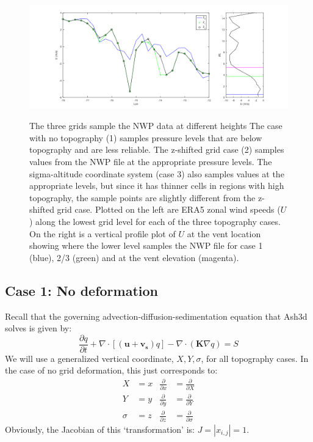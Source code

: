 \begin{figure}[htbp]\vspace*{0cm}\hspace*{0cm}
\includegraphics[angle=0,scale=0.4]{Figures/Apx_Topo/Topo_U.png}\\
\parbox{15cm}{\caption{\label{FigTopo_SurfU}
The three grids sample the NWP data at different heights
The case with no topography (1) samples pressure levels that are below topography
and are less reliable. The z-shifted grid case (2) samples values from the NWP file
at the appropriate pressure levels. The sigma-altitude coordinate system (case 3) also
samples values at the appropriate levels, but since it has thinner cells in regions with
high topography, the sample points are slightly different from the z-shifted
grid case. Plotted on the left are ERA5 zonal wind speeds ($U$) along the lowest grid
level for each of the three topography cases. On the right is a vertical profile plot of $U$
at the vent location showing where the lower level samples the NWP file for case 1 (blue),
2/3 (green) and at the vent elevation (magenta).
}}
\end{figure}

\subsection{Case 1: No deformation}
Recall that the governing advection-diffusion-sedimentation equation that Ash3d solves is
given by:
\begin{equation}\label{EqGovEqVectApx}
 \frac{\partial q}{\partial t} +
   \nabla \cdot \left[ \left(\mathbf{u} + \mathbf{v_s} \right) q \right]
 - \nabla \cdot \left( \mathbf{K} \nabla q\right) = S
\end{equation}
We will use a generalized vertical coordinate, $X,Y,\sigma$, for all topography cases.
In the case of no grid deformation, this just corresponds to:
\begin{align*}
X &= x &  \frac{\partial}{\partial x} &= \frac{\partial}{\partial X}\\
Y &= y &  \frac{\partial}{\partial y} &= \frac{\partial}{\partial Y}\\
\sigma &= z &  \frac{\partial}{\partial z} &= \frac{\partial}{\partial \sigma}
\end{align*}
Obviously, the Jacobian of this `transformation' is: $J = |x_{i,j}| = 1$.

